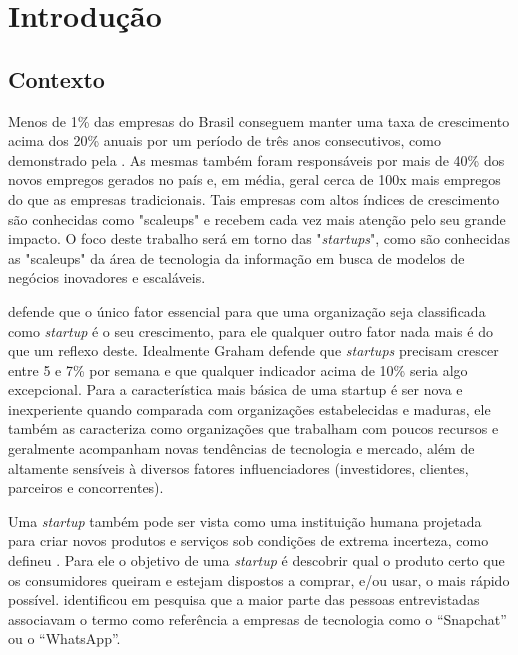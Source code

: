 \chapter{Introdução}
\label{cap-introducao}

\section{Contexto}
\label{section:contexto}

Menos de 1\% das empresas do Brasil conseguem manter uma taxa de crescimento acima dos 20\% anuais por um período de três anos consecutivos, como demonstrado pela . As mesmas também foram responsáveis por mais de 40\% dos novos empregos gerados no país e, em média, geral cerca de 100x mais empregos do que as empresas tradicionais. Tais empresas com altos índices de crescimento são conhecidas como "scaleups" e recebem cada vez mais atenção pelo seu grande impacto. O foco deste trabalho será em torno das "\textit{startups}", como são conhecidas as "scaleups" da área de tecnologia da informação em busca de modelos de negócios inovadores e escaláveis.

 defende que o único fator essencial para que uma organização seja classificada como \textit{startup} é o seu crescimento, para ele qualquer outro fator nada mais é do que um reflexo deste. Idealmente Graham defende que \textit{startups} precisam crescer entre 5 e 7\% por semana e que qualquer indicador acima de 10\% seria algo excepcional. Para  a característica mais básica de uma startup é ser nova e inexperiente quando comparada com organizações estabelecidas e maduras, ele também as caracteriza como organizações que trabalham com poucos recursos e geralmente acompanham novas tendências de tecnologia e mercado, além de altamente sensíveis à diversos fatores influenciadores (investidores, clientes, parceiros e concorrentes).

Uma \textit{startup} também pode ser vista como uma instituição humana projetada para criar novos produtos e serviços sob condições de extrema incerteza, como defineu . Para ele o objetivo de uma \textit{startup} é descobrir qual o produto certo que os consumidores queiram e estejam dispostos a comprar, e/ou usar, o mais rápido possível.  identificou em pesquisa que a maior parte das pessoas entrevistadas associavam o termo como referência a empresas de tecnologia como o ``Snapchat'' ou o ``WhatsApp''.

